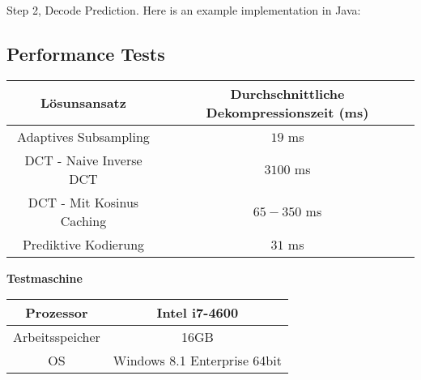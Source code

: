 Step 2, Decode Prediction. Here is an example implementation in Java:

\pagebreak

\subsection*{Performance Tests} \label{anhang:performance}
\begin{table}[!htbp]
\center
\begin{tabular}{c|c}
	Lösunsansatz & Durchschnittliche Dekompressionszeit (ms) \\\hline
	Adaptives Subsampling & $19$ ms \\
	DCT - Naive Inverse DCT & $3100$ ms \\
	DCT - Mit Kosinus Caching & $65-350$ ms\\
	Prediktive Kodierung & $31$ ms\\
\end{tabular}
\end{table}

\textbf{Testmaschine}
\begin{table}[!htbp]
\center
\begin{tabular}{c|c}
	Prozessor & Intel i7-4600 \\\hline
	Arbeitsspeicher & 16GB \\
	OS & Windows 8.1 Enterprise 64bit \\
\end{tabular}
\end{table}
